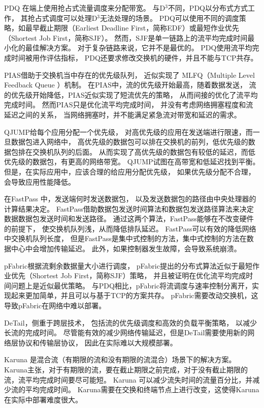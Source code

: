 PDQ \cite{PDQ}在端上使用抢占式流量调度来分配带宽。
与D$^{3}$不同，PDQ以分布式方式工作，
其抢占式调度可以处理D$^{3}$无法处理的场景。
PDQ可以使用不同的调度策略，如最早截止期限（Earliest Deadline First，简称EDF）或最短作业优先（Shortest Job First，简称SJF）。
然而，SJF是单一链路上的流平均完成时间最小化的最佳解决方案。
对于复杂链路来说，它并不是最优的。
PDQ使用流平均完成时间被用作评估指标，
PDQ还要求修改交换机的硬件，并且不能与TCP共存。
 
 PIAS\cite{bai2015information}借助于交换机当中存在的优先级队列， 近似实现了 MLFQ（Multiple Level Feedback Queue ）机制。
 在PIAS中，流的优先级开始最高，随着数据发送，
 流的优先级开始降低，PIAS近似实现了短流优先的策略，
 从而间接的优化了流平均完成时间。
 然而PIAS只是优化流平均完成时间，
 并没有考虑网络拥塞程度和流延迟之间的关系，
 当网络拥塞时，并不能满足紧急流对带宽和延迟的需求。
 
 
 
QJUMP\cite{grosvenor2015queues}给每个应用分配一个优先级，
对高优先级的应用在发送端进行限速，而一旦数据包进入网络中，
高优先级的数据包可以排在交换机的前列，低优先级的数据包排在交换机队列的后面。
从而实现了高优先级的数据包有较低的延迟，而低优先级的数据包，有更高的网络带宽。
QJUMP试图在高带宽和低延迟找到平衡。
但是，在实际应用中，应该合理的给应用分配优先级，
如果优先级分配不合理，会导致应用性能降低。
 
 
在FastPass \cite{perry2015fastpass}中，发送端何时发送数据包，
以及发送数据包的路径由中央处理器的计算结果决定。
FastPass借助数据包发送时间算法和数据包发送路径算法来决定数据数据包发送时间和发送路径。
通过这两个算法，FastPass能够在不改变硬件的前提下，
使交换机队列浅，从而降低排队延迟。
FastPass可以有效的降低网络中交换机队列长度，
但是FastPass是集中式控制的方法，集中式控制的方法在数据中心中会增加传输延迟。
此外，如果控制器发生故障，会导致系统崩溃。

pFabric\cite{pFabric}根据流剩余数据量大小进行调度，
pFabric\cite{pFabric}提出的分布式算法近似于最短作业优先（Shortest Job First，简称SJF）策略，
并且被证明在优化流平均完成时间问题上是近似最优策略。
与PDQ相比，pFabric将流调度与速率控制分离开，实现起来更加简单，并且可以与基于TCP的方案共存。
pFabric需要改动交换机，这导致pFabric在网络中难以部署。
 
 
DeTail\cite{DeTail}，侧重于跨层技术，
包括流的优先级调度和高效的负载平衡策略，
以减少长流的完成时间。
尽管能有效的减少网络传输延迟，但是DeTail需要使用新的网络层协议和传输层协议，
因此在实际难以大规模部署。


Karuna \cite{chen2016scheduling} 是混合流（有期限的流和没有期限的流混合）场景下的解决方案。
Karuna主张，对于有期限的流，要在截止期限之前完成，对于没有截止期限的流，流平均完成时间要尽可能短。
Karuna \cite{chen2016scheduling} 可以减少流失时间的流量百分比，并减少流的平均完成时间。 
Karuna需要在交换和终端节点上进行改变，这使得Karuna在实际中部署难度很大。

